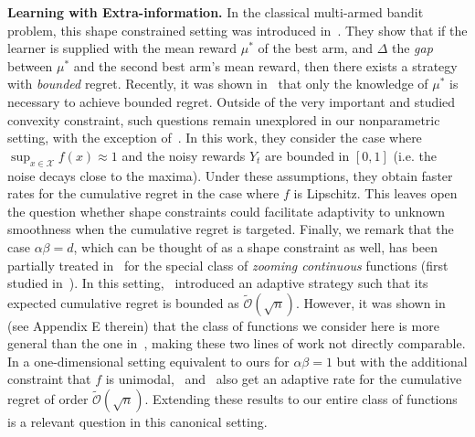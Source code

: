 \documentclass[final,12pt]{colt2018}
\newcommand{\tildeO}[1]{\tilde{\mathcal O}\left( #1 \right)}
\begin{document}
\noindent\textbf{Learning with Extra-information.} In the classical multi-armed bandit problem, this shape constrained setting was introduced in~\cite{bubeck2013bounded}. They show that if the learner is supplied with the mean reward $\mu^*$ of the best arm, and $\Delta$ the \emph{gap} between $\mu^*$ and the second best arm's mean reward, then there exists a strategy with \emph{bounded} regret. Recently, it was shown in~\cite{garivier2016explore} that only the knowledge of $\mu^*$ is necessary to achieve bounded regret. Outside of the very important and studied convexity constraint, such questions remain unexplored in our nonparametric setting, with the exception of~\cite{kleinberg2013bandits}. In this work, they consider the case where $\sup_{x\in \mathcal X} f(x) \approx 1$ and the noisy rewards $Y_t$ are bounded in $[0,1]$ (i.e. the noise decays close to the maxima). Under these assumptions, they obtain faster rates for the cumulative regret in the case where $f$ is Lipschitz. This leaves open the question whether shape constraints could facilitate adaptivity to unknown smoothness when the cumulative regret is targeted. Finally, we remark that the case $\alpha\beta = d$, which can be thought of as a shape constraint as well, has been partially treated in~\cite{bull2015adaptive} for the special class of \emph{zooming continuous} functions (first studied in~\cite{slivkins2011multi}). In this setting,~\cite{bull2015adaptive} introduced an adaptive strategy such that its expected cumulative regret is bounded as $\tildeO{\sqrt{n}}$. However, it was shown in~\cite{grill2015black} (see Appendix E therein) that the class of functions we consider here is more general than the one in~\cite{slivkins2011multi,bull2015adaptive}, making these two lines of work not directly comparable. In a one-dimensional setting equivalent to ours for $\alpha\beta = 1$ but with the additional constraint that $f$ is unimodal,~\cite{yu2011unimodal} and~\cite{combes2014unimodal} also get an adaptive rate for the cumulative regret of order $\tildeO{\sqrt{n}}$. Extending these results to our entire class of functions is a relevant question in this canonical setting.
\end{document}
